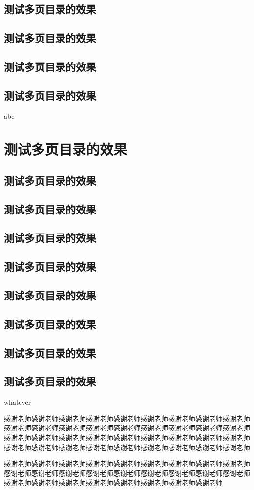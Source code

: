 \documentclass{HustGraduPaper}
\begin{document}
	\subsection{测试多页目录的效果}
	\subsection{测试多页目录的效果}
	\subsection{测试多页目录的效果}
	\subsection{测试多页目录的效果}
	abc
	\section{测试多页目录的效果}
	\subsection{测试多页目录的效果}
	\subsection{测试多页目录的效果}
	\subsection{测试多页目录的效果}
	\subsection{测试多页目录的效果}
	\subsection{测试多页目录的效果}
	\subsection{测试多页目录的效果}
	\subsection{测试多页目录的效果}
	\subsection{测试多页目录的效果}
	whatever
	
	\begin{thankpage}
		感谢老师感谢老师感谢老师感谢老师感谢老师感谢老师感谢老师感谢老师感谢老师感谢老师感谢老师感谢老师感谢老师感谢老师感谢老师感谢老师感谢老师感谢老师感谢老师感谢老师感谢老师感谢老师感谢老师感谢老师感谢老师感谢老师感谢老师感谢老师感谢老师感谢老师感谢老师感谢老师感谢老师感谢老师感谢老师感谢老师
		
		感谢老师感谢老师感谢老师感谢老师感谢老师感谢老师感谢老师感谢老师感谢老师感谢老师感谢老师感谢老师感谢老师感谢老师感谢老师感谢老师感谢老师感谢老师感谢老师感谢老师感谢老师感谢老师感谢老师感谢老师感谢老师感谢老师
	\end{thankpage}
	
\end{document}
